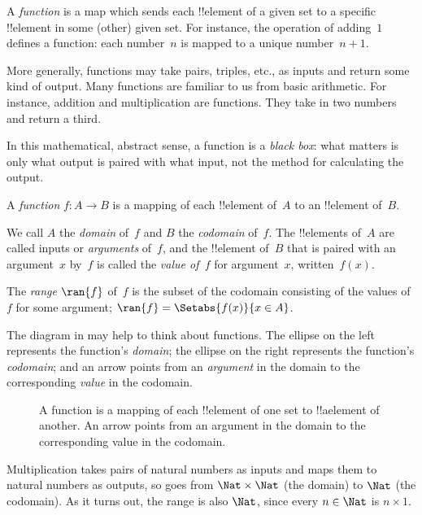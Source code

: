 \documentclass[../../../include/open-logic-section]{subfiles}
\begin{document}

\begin{explain}
A \emph{function} is a map which sends each !!{element} of a given set
to a specific !!{element} in some (other) given set. For instance, the
operation of adding~$1$ defines a function: each number~$n$ is mapped
to a unique number~$n+1$. 
  
More generally, functions may take pairs, triples, etc., as inputs and
return some kind of output. Many functions are familiar to us from
basic arithmetic. For instance, addition and multiplication are
functions. They take in two numbers and return a third.

In this mathematical, abstract sense, a function is a \emph{black
box}: what matters is only what output is paired with what input, not
the method for calculating the output.
\end{explain}

\begin{defn}[Function]
A \emph{function} $f \colon A \to B$ is a mapping of each !!{element}
of~$A$ to an !!{element} of~$B$.

We call $A$ the \emph{domain} of~$f$ and $B$ the \emph{codomain}
of~$f$.  The !!{element}s of~$A$ are called inputs or \emph{arguments}
of~$f$, and the !!{element} of~$B$ that is paired with an argument~$x$
by~$f$ is called the \emph{value of~$f$} for argument~$x$,
written~$f(x)$.

The \emph{range} $\ran{f}$ of~$f$ is the subset of the codomain
consisting of the values of~$f$ for some argument; $\ran{f} =
\Setabs{f(x)}{x \in A}$.
\end{defn}

The diagram in  may help to think about functions. The ellipse
on the left represents the function's \emph{domain}; the ellipse on
the right represents the function's \emph{codomain}; and an arrow
points from an \emph{argument} in the domain to the corresponding
\emph{value} in the codomain.

\begin{figure}
  \caption{A function is a mapping of each !!{element} of one set to
    !!a{element} of another. An arrow points from an argument in the
    domain to the corresponding value in the codomain.}
\end{figure}

\begin{ex}
Multiplication takes pairs of natural numbers as inputs and maps them
to natural numbers as outputs, so goes from $\Nat \times \Nat$ (the
domain) to $\Nat$ (the codomain). As it turns out, the range is also
$\Nat$, since every $n \in \Nat$ is $n \times 1$.
\end{ex}
\end{document}
